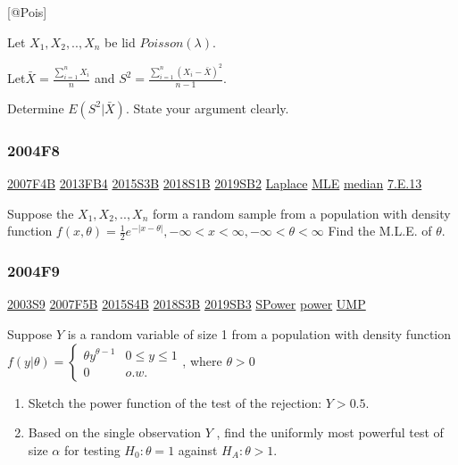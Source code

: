 \documentclass[10pt,twocolumn,portrait]{article}
\begin{document}
{[}@Pois{]}

Let \(X_1,X_2,..,X_n\) be lid \(Poisson(\lambda)\).

Let\(\bar X=\frac{\sum_{i=1}^{n}X_{i}}{n}\) and
\(S^2=\frac{\sum_{i=1}^{n}(X_{i}-\bar X)^2}{n-1}\).

Determine \(E(S^2|\bar X)\). State your argument clearly.

\hypertarget{f8-2}{%
\subsubsection{2004F8}\label{f8-2}}

\protect\hyperlink{f4b}{2007F4B} \protect\hyperlink{fb4-2}{2013FB4}
\protect\hyperlink{s3b-1}{2015S3B} \protect\hyperlink{s1b-2}{2018S1B}
\protect\hyperlink{sb2-3}{2019SB2} \protect\hyperlink{Laplace}{Laplace}
\protect\hyperlink{MLE}{MLE} \protect\hyperlink{median}{median}
\protect\hyperlink{e.13}{7.E.13}

Suppose the \(X_1,X_2,..,X_n\) form a random sample from a population
with density function
\(f(x,\theta) =\frac12e^{-|x-\theta|}, -\infty<x<\infty, -\infty<\theta<\infty\)
Find the M.L.E. of \(\theta\).

\hypertarget{f9-2}{%
\subsubsection{2004F9}\label{f9-2}}

\protect\hyperlink{s9}{2003S9} \protect\hyperlink{f5b}{2007F5B}
\protect\hyperlink{s4b-1}{2015S4B} \protect\hyperlink{s3b-2}{2018S3B}
\protect\hyperlink{sb3-3}{2019SB3} \protect\hyperlink{SPower}{SPower}
\protect\hyperlink{power}{power} \protect\hyperlink{section-7}{UMP}

Suppose \(Y\) is a random variable of size 1 from a population with
density function
\(f(y|\theta)=\begin{cases}\theta y^{\theta-1}& 0\le y\le1\\0& o.w.\end{cases}\),
where \(\theta>0\)

\begin{enumerate}
\def\labelenumi{(\alph{enumi})}
\item
  Sketch the power function of the test of the rejection: \(Y>0.5\).
\item
  Based on the single observation \(Y\) , find the uniformly most
  powerful test of size \(\alpha\) for testing \(H_0:\theta=1\) against
  \(H_A :\theta>1\).
\end{enumerate}
\end{document}
